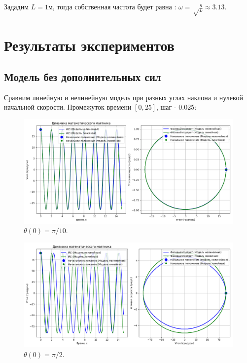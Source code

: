  

Зададим $L = 1\text{м}$, тогда собственная частота будет равна : $\omega = \sqrt\frac{g}{L} \approx 3.13$.
\section{Результаты  экспериментов}
\subsection*{Модель без дополнительных сил}
Сравним линейную и нелинейную модель при разных углах наклона и нулевой начальной скорости. Промежуток времени $[0,25]$, шаг - 0.025:
\begin{figure}[h]  %
	\centering
	\includegraphics[width=1\textwidth]{imgs/pi10.png}  %
	\caption{$\theta(0) = \pi / 10$.}  %
	\label{fig:pi10}  %
\end{figure}
\begin{figure}[h]  %
	\centering
	\includegraphics[width=1\textwidth]{imgs/pi2.png}  %
	\caption{$\theta(0) = \pi / 2$.}  %
	\label{fig:pi2}  %
\end{figure}

